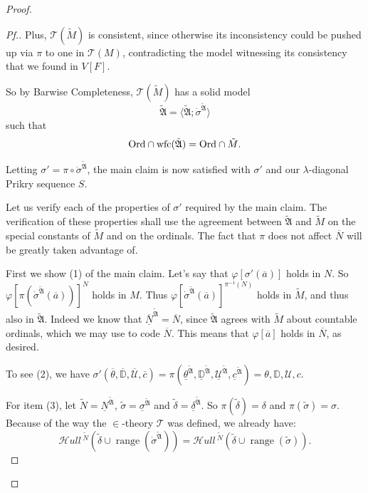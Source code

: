 \documentclass{amsart}
\theoremstyle{definition}
\theoremstyle{remark}
\newcommand{\D}{\mathbb{D}}
\newcommand{\N}{{\overline{N}}}
\newcommand{\U}{\mathcal{U}}
\newcommand{\Ord}{\textup{\ensuremath{\text{Ord}}}}
\DeclareMathOperator{\ran}{range}
\newcommand{\SH}{\mathcal{H}\textit{ull} \,}
\newcommand{\sk}[3]{\SH^{#1}( {#2} \cup {\ran(#3)} ) }
\begin{document}
\begin{proof}
\begin{proof}[Pf.]
Plus, $\mathcal T(\tilde M)$ is consistent, since otherwise its inconsistency could be pushed up via $\pi$ to one in $\mathcal T(M)$, contradicting the model witnessing its consistency that we found in $V[F]$. 

So by Barwise Completeness, $\mathcal T(\tilde M)$ has a solid model $$\tilde{\mathfrak A} = \langle \tilde{\mathfrak A}; \dot{\sigma}^{\tilde{\mathfrak A}} \rangle$$ such that $$\text{Ord} \cap \text{wfc}(\tilde{\mathfrak A}) = \Ord \cap \tilde M.$$ 

Letting $\sigma'=\pi \circ \dot{\sigma}^{\tilde{\mathfrak A}}$, the main claim is now satisfied with $\sigma'$ and our $\lambda$-diagonal Prikry sequence $S$. 

Let us verify each of the properties of $\sigma'$ required by the main claim. The verification of these properties shall use the agreement between $\tilde{\mathfrak A}$ and $\tilde M$ on the special constants of $\tilde M$ and on the ordinals. The fact that $\pi$ does not affect $\N$ will be greatly taken advantage of.

First we show (1) of the main claim. Let's say that $\varphi[\sigma'(\overline a)]$ holds in $N$. So $\varphi[\pi(\dot \sigma^{\tilde{\mathfrak A}}(\overline a))]^N$ holds in $M$. Thus $\varphi[\dot \sigma^{\tilde{\mathfrak A}}(\overline a)]^{\pi^{-1}(N)}$ holds in $\tilde M$, and thus also in $\tilde{\mathfrak A}$. Indeed we know that $\underline{\N}^{\tilde{\mathfrak A}} = \N$, since $\tilde{\mathfrak A}$ agrees with $\tilde M$ about countable ordinals, which we may use to code $\N$. This means that $\varphi[\overline a]$ holds in $\N$, as desired.

To see (2), we have $\sigma'(\overline \theta, \overline{\D}, \overline{\U}, \overline c)= \pi(\underline{\theta}^{\tilde{\mathfrak A}}, \underline{\D}^{\tilde{\mathfrak A}}, \underline{\U}^{\tilde{\mathfrak A}}, \underline{c}^{\tilde{\mathfrak A}})=\theta, \D, \U, c$.

For item (3), let $\tilde N = \underline N^{\tilde{\mathfrak A}}$, $\tilde \sigma = \underline \sigma^{\tilde{\mathfrak A}}$ and $\tilde \delta = \underline{\delta}^{\tilde{\mathfrak A}}$. So $\pi(\tilde \delta)= \delta$ and $\pi(\tilde \sigma)=\sigma$. Because of the way the $\in$-theory $\mathcal T$ was defined, we already have: 
\begin{equation}\label{eqn:SkDotSigma=SkTildeSigma} \sk{\tilde N}{\tilde \delta}{\dot \sigma^{\tilde{\mathfrak A}}} = \sk{\tilde N}{\tilde \delta}{\tilde \sigma}. \end{equation}


\end{proof}
\end{proof}
\end{document}
